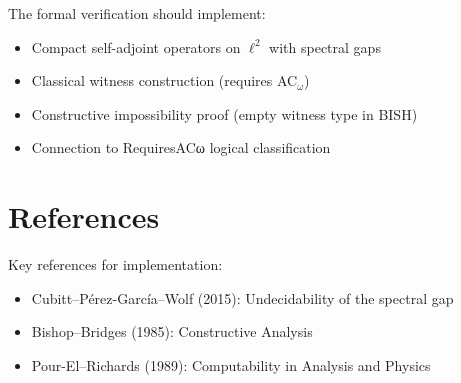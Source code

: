 \documentclass[11pt]{article}
\theoremstyle{definition}\newtheorem{definition}[theorem]{Definition}
\theoremstyle{remark}\newtheorem{remark}[theorem]{Remark}
\begin{document}
The formal verification should implement:
\begin{itemize}
\item Compact self-adjoint operators on $\ell^2$ with spectral gaps
\item Classical witness construction (requires AC$_\omega$)  
\item Constructive impossibility proof (empty witness type in BISH)
\item Connection to RequiresACω logical classification
\end{itemize}

\section*{References}

Key references for implementation:
\begin{itemize}
\item Cubitt–Pérez-García–Wolf (2015): Undecidability of the spectral gap
\item Bishop–Bridges (1985): Constructive Analysis
\item Pour-El–Richards (1989): Computability in Analysis and Physics
\end{itemize}
\end{document}
